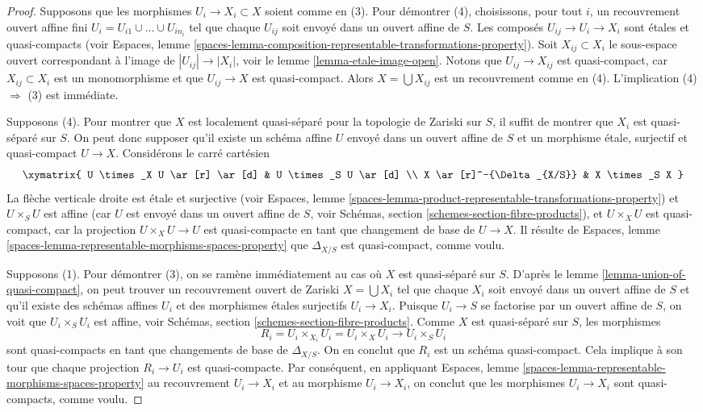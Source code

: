\begin{proof}
Supposons que les morphismes $U_i \to X_i \subset X$ soient comme en (3). Pour démontrer (4),
choisissons, pour tout $i$, un recouvrement ouvert affine fini $U_i =
U_{i1} \cup \ldots \cup U_{in_i}$ tel que chaque $U_{ij}$ soit envoyé
dans un ouvert affine de $S$. Les composés
$U_{ij} \to U_i \to X_i$ sont étales et quasi-compacts (voir
Espaces, lemme
\ref{spaces-lemma-composition-representable-transformations-property}).
Soit $X_{ij} \subset X_i$ le sous-espace ouvert correspondant à
l'image de $|U_{ij}| \to |X_i|$, voir le
lemme \ref{lemma-etale-image-open}.
Notons que $U_{ij} \to X_{ij}$ est quasi-compact, car $X_{ij} \subset X_i$
est un monomorphisme et que $U_{ij} \to X$ est quasi-compact.
Alors $X = \bigcup X_{ij}$ est un recouvrement comme en (4).
L'implication (4) $\Rightarrow$ (3) est immédiate.

\medskip\noindent
Supposons (4). Pour montrer que $X$ est localement quasi-séparé pour la topologie de Zariski sur $S$,
il suffit de montrer que $X_i$ est quasi-séparé sur $S$.
On peut donc supposer qu'il existe un schéma affine $U$ envoyé dans
un ouvert affine de $S$ et un morphisme étale, surjectif et quasi-compact
$U \to X$. Considérons le carré cartésien
$$
\xymatrix{
U \times_X U \ar[r] \ar[d] & U \times_S U \ar[d] \\
X \ar[r]^-{\Delta_{X/S}} & X \times_S X
}
$$
La flèche verticale droite est étale et surjective (voir
Espaces, lemme
\ref{spaces-lemma-product-representable-transformations-property})
et $U \times_S U$ est affine (car $U$ est envoyé dans un ouvert affine de $S$, voir
Schémas, section \ref{schemes-section-fibre-products}),
et $U \times_X U$ est quasi-compact,
car la projection $U \times_X U \to U$ est quasi-compacte en tant que
changement de base de $U \to X$. Il résulte de
Espaces, lemme \ref{spaces-lemma-representable-morphisms-spaces-property}
que $\Delta_{X/S}$ est quasi-compact, comme voulu.

\medskip\noindent
Supposons (1). Pour démontrer (3), on se ramène immédiatement au cas
où $X$ est quasi-séparé sur $S$. D'après le
lemme \ref{lemma-union-of-quasi-compact},
on peut trouver un recouvrement ouvert de Zariski $X = \bigcup X_i$ tel que chaque
$X_i$ soit envoyé dans un ouvert affine de $S$ et qu'il existe des schémas affines
$U_i$ et des morphismes étales surjectifs $U_i \to X_i$.
Puisque $U_i \to S$ se factorise par un ouvert affine de $S$, on voit que
$U_i \times_S U_i$ est affine, voir
Schémas, section \ref{schemes-section-fibre-products}.
Comme $X$ est quasi-séparé sur $S$, les morphismes
$$
R_i = U_i \times_{X_i} U_i = U_i \times_X U_i
\longrightarrow
U_i \times_S U_i
$$
sont quasi-compacts en tant que changements de base de $\Delta_{X/S}$. On en conclut
que $R_i$ est un schéma quasi-compact. Cela implique à son tour que chaque
projection $R_i \to U_i$ est quasi-compacte. Par conséquent, en appliquant
Espaces, lemme \ref{spaces-lemma-representable-morphisms-spaces-property}
au recouvrement $U_i \to X_i$ et au morphisme $U_i \to X_i$,
on conclut que les morphismes $U_i \to X_i$ sont quasi-compacts, comme voulu.


\end{proof}
